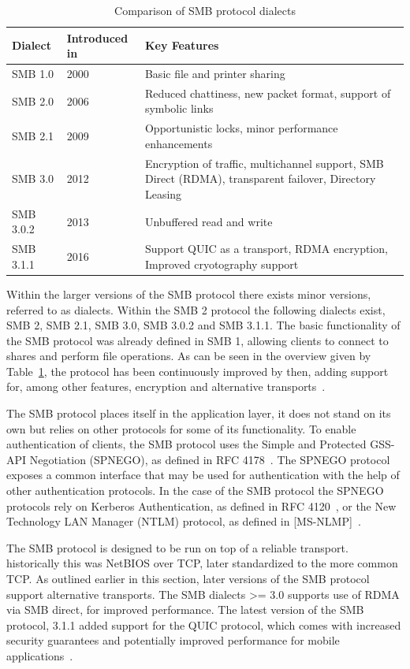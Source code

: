 \documentclass[english, 12pt, a4paper, elec, utf8, a-2b, online]{aaltothesis}
\begin{document}
\begin{table}[h]
\centering
\caption{Comparison of SMB protocol dialects}
\label{tab:smb_dialects}
\begin{tabular}{|l|p{5cm}|p{5cm}|}
\hline
\textbf{Dialect} & \textbf{Introduced in} & \textbf{Key Features}\\ \hline
SMB 1.0 & 2000 & Basic file and printer sharing \\ \hline
SMB 2.0 & 2006 & Reduced chattiness, new packet format, support of symbolic links \\ \hline
SMB 2.1 & 2009 & Opportunistic locks, minor performance enhancements \\ \hline
SMB 3.0 & 2012 & Encryption of traffic, multichannel support, SMB Direct (RDMA), transparent failover, Directory Leasing \\ \hline
SMB 3.0.2 & 2013 & Unbuffered read and write \\ \hline
SMB 3.1.1 & 2016 & Support QUIC as a transport, RDMA encryption, Improved cryotography support \\ \hline
\end{tabular}
\end{table}

Within the larger versions of the SMB protocol there exists minor versions, referred
to as dialects. Within the SMB 2 protocol the following dialects exist, SMB 2,
SMB 2.1, SMB 3.0, SMB 3.0.2 and SMB 3.1.1. The basic functionality of the SMB protocol
was already defined in SMB 1, allowing clients to connect to shares and perform file
operations. As can be seen in the overview given by Table~\ref{tab:smb_dialects},
the protocol has been continuously improved by then, adding support for, among other
features, encryption and alternative transports~\cite{smb2_tech}.

The SMB protocol places itself in the application layer, it does not stand on its
own but relies on other protocols for some of its functionality. To enable authentication
of clients, the SMB protocol uses the Simple and Protected GSS-API Negotiation (SPNEGO), as
defined in RFC 4178~\cite{rfc4178}. The SPNEGO protocol exposes a common interface
that may be used for authentication with the help of other authentication protocols.
In the case of the SMB protocol the SPNEGO protocols rely on Kerberos Authentication, as
defined in RFC 4120~\cite{rfc4120}, or the New Technology LAN Manager (NTLM) protocol,
as defined in {[MS-NLMP]}~\cite{ntlm_tech}.

The SMB protocol is designed to be run on top of a reliable transport. historically
this was NetBIOS over TCP, later standardized to the more common TCP. As outlined earlier
in this section, later versions of the SMB protocol support alternative transports. The
SMB dialects >= 3.0 supports use of RDMA via SMB direct, for improved performance.
The latest version of the SMB protocol, 3.1.1 added support for the QUIC protocol,
which comes with increased security guarantees and potentially improved performance
for mobile applications~\cite{smb2_tech}.
\end{document}

